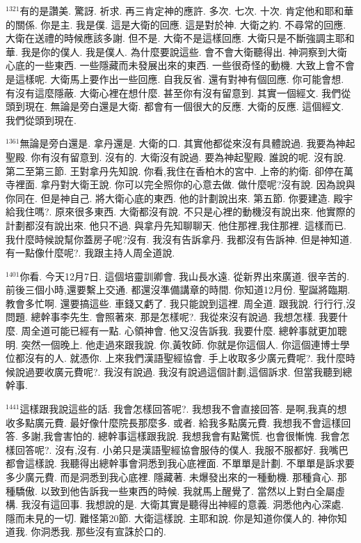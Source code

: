 \documentclass{book}
\begin{document}
$^{1321}$有的是讚美.
驚訝.
祈求.
再三肯定神的應許.
多次.
七次.
十次.
肯定他和耶和華的關係.
你是主.
我是僕.
這是大衛的回應.
這是對於神.
大衛之約.
不尋常的回應.
大衛在送禮的時候應該多謝.
但不是.
大衛不是這樣回應.
大衛只是不斷強調主耶和華.
我是你的僕人.
我是僕人.
為什麼要說這些.
會不會大衛聽得出.
神洞察到大衛心底的一些東西.
一些隱藏而未發展出來的東西.
一些很奇怪的動機.
大致上會不會是這樣呢.
大衛馬上要作出一些回應.
自我反省.
還有對神有個回應.
你可能會想.
有沒有這麼隱蔽.
大衛心裡在想什麼.
甚至你有沒有留意到.
其實一個經文.
我們從頭到現在.
無論是旁白還是大衛.
都會有一個很大的反應.
大衛的反應.
這個經文.
我們從頭到現在.

$^{1361}$無論是旁白還是.
拿丹還是.
大衛的口.
其實他都從來沒有具體說過.
我要為神起聖殿.
你有沒有留意到.
沒有的.
大衛沒有說過.
要為神起聖殿.
誰說的呢.
沒有說.
第二至第三節.
王對拿丹先知說.
你看,我住在香柏木的宮中.
上帝的約衛.
卻停在萬寺裡面.
拿丹對大衛王說.
你可以完全照你的心意去做.
做什麼呢?沒有說.
因為說與你同在.
但是神自己.
將大衛心底的東西.
他的計劃說出來.
第五節.
你要建造.
殿宇給我住嗎?.
原來很多東西.
大衛都沒有說.
不只是心裡的動機沒有說出來.
他實際的計劃都沒有說出來.
他只不過.
與拿丹先知聊聊天.
他住那裡,我住那裡.
這樣而已.
我什麼時候說幫你蓋房子呢?沒有.
我沒有告訴拿丹.
我都沒有告訴神.
但是神知道.
有一點像什麼呢?.
我跟主持人周全道說.

$^{1401}$你看.
今天12月7日.
這個培靈訓卿會.
我山長水遠.
從新界出來廣道.
很辛苦的.
前後三個小時,還要繫上交通.
都還沒準備講章的時間.
你知道12月份.
聖誕將臨期.
教會多忙啊.
還要搞這些.
車錢又虧了.
我只能說到這裡.
周全道.
跟我說.
行行行,沒問題.
總幹事李先生.
會照著來.
那是怎樣呢?.
我從來沒有說過.
我想怎樣.
我要什麼.
周全道可能已經有一點.
心領神會.
他又沒告訴我.
我要什麼.
總幹事就更加聰明.
突然一個晚上.
他走過來跟我說.
你,黃牧師.
你就是你這個人.
你這個連博士學位都沒有的人.
就憑你.
上來我們漢語聖經協會.
手上收取多少廣元費呢?.
我什麼時候說過要收廣元費呢?.
我沒有說過.
我沒有說過這個計劃,這個訴求.
但當我聽到總幹事.

$^{1441}$這樣跟我說這些的話.
我會怎樣回答呢?.
我想我不會直接回答.
是啊,我真的想收多點廣元費.
最好像什麼院長那麼多.
或者.
給我多點廣元費.
我想我不會這樣回答.
多謝,我會害怕的.
總幹事這樣跟我說.
我想我會有點驚慌.
也會很慚愧.
我會怎樣回答呢?.
沒有,沒有.
小弟只是漢語聖經協會服侍的僕人.
我服不服都好.
我嘴巴都會這樣說.
我聽得出總幹事會洞悉到我心底裡面.
不單單是計劃.
不單單是訴求要多少廣元費.
而是洞悉到我心底裡.
隱藏著.
未爆發出來的一種動機.
那種貪心.
那種驕傲.
以致到他告訴我一些東西的時候.
我就馬上醒覺了.
當然以上對白全屬虛構.
我沒有這回事.
我想說的是.
大衛其實是聽得出神經的意義.
洞悉他內心深處.
隱而未見的一切.
難怪第20節.
大衛這樣說.
主耶和說.
你是知道你僕人的.
神你知道我.
你洞悉我.
那些沒有宣誅於口的.
\end{document}
